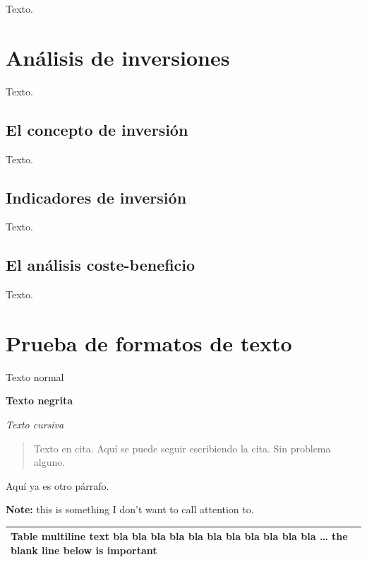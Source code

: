 \documentclass[
]{krantz}
\begin{document}
Texto.

\hypertarget{anuxe1lisis-de-inversiones}{%
\chapter{Análisis de inversiones}\label{anuxe1lisis-de-inversiones}}

Texto.

\hypertarget{el-concepto-de-inversiuxf3n}{%
\section{El concepto de inversión}\label{el-concepto-de-inversiuxf3n}}

Texto.

\hypertarget{indicadores-de-inversiuxf3n}{%
\section{Indicadores de inversión}\label{indicadores-de-inversiuxf3n}}

Texto.

\hypertarget{el-anuxe1lisis-coste-beneficio}{%
\section{El análisis coste-beneficio}\label{el-anuxe1lisis-coste-beneficio}}

Texto.

\hypertarget{prueba-de-formatos-de-texto}{%
\chapter{Prueba de formatos de texto}\label{prueba-de-formatos-de-texto}}

Texto normal

\textbf{Texto negrita}

\emph{Texto cursiva}

\begin{quote}
Texto en cita.
Aquí se puede seguir escribiendo la cita.
Sin problema alguno.
\end{quote}

Aquí ya es otro párrafo.

\textbf{Note:} this is something I don't want to call attention to.

\begin{longtable}[]{@{}l@{}}
\toprule
\endhead
\begin{minipage}[t]{0.81\columnwidth}\raggedright
Table multiline text bla bla bla bla
bla bla bla bla bla bla bla \ldots{} the
blank line below is important\strut
\end{minipage}\tabularnewline
\bottomrule
\end{longtable}

  
\end{document}
